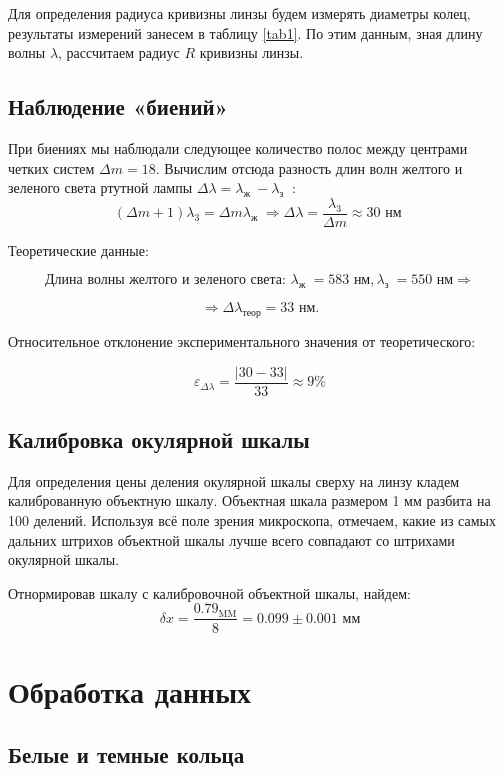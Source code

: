 \documentclass[a4paper, 12pt]{article}%
\begin{document}
Для определения радиуса кривизны линзы будем измерять диаметры колец, результаты измерений занесем в таблицу \ref{tab1}. По этим данным, зная длину волны $\lambda$, рассчитаем радиус $R$ кривизны линзы.

\subsection{Наблюдение «биений»}

При биениях мы наблюдали следующее количество полос между центрами четких систем $\Delta m=18 .$ Вычислим отсюда разность длин волн желтого и зеленого света ртутной лампы $\Delta \lambda=\lambda_{\text {ж }}-\lambda_{\text {з }}$ :
$$
(\Delta m+1) \lambda_{3}=\Delta m \lambda_{\text {ж }} \Rightarrow \Delta \lambda=\frac{\lambda_{3}}{\Delta m} \approx 30 \text { нм }
$$

Теоретические данные:

\[ \text{Длина волны желтого и зеленого света: } \lambda_{\text {ж }} = 583 \text{ нм}, \lambda_{\text {з }} = 550 \text{ нм} \Rightarrow \]

\[ \Rightarrow \Delta \lambda_{\text{теор}} = 33 \text{ нм}.\]

Относительное отклонение экспериментального значения от теоретического:

\[ \varepsilon_{\Delta \lambda} = \frac{|30 - 33|}{33} \approx 9\% \]

\subsection{Калибровка окулярной шкалы}

Для определения цены деления окулярной шкалы сверху на линзу кладем калиброванную объектную шкалу.
Объектная шкала размером 1 мм разбита на 100 делений. Используя всё поле зрения микроскопа, отмечаем, какие из самых дальних штрихов объектной шкалы лучше всего совпадают со штрихами окулярной шкалы.

Отнормировав шкалу с калибровочной объектной шкалы, найдем:
$$
\delta x=\frac{0.79_{\mathrm{MM}}}{8}=0.099 \pm 0.001 \text{ мм}
$$

\section{Обработка данных}

\subsection{Белые и темные кольца}
\end{document}
